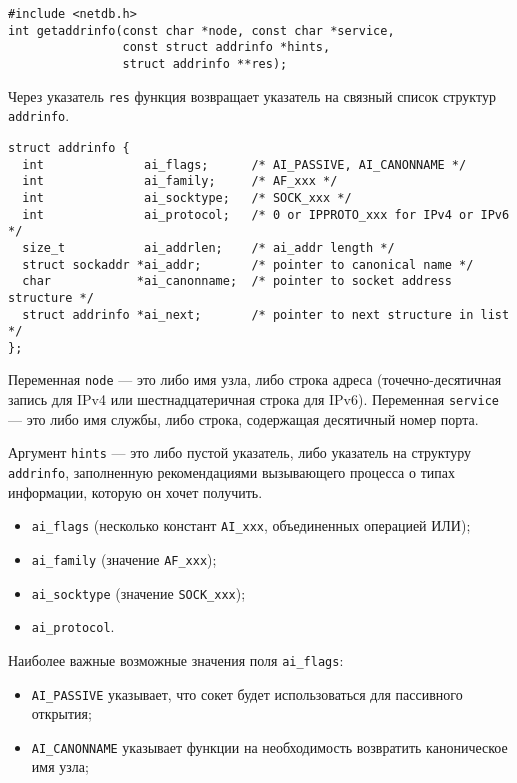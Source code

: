 \lstset{language=C,caption=}
\begin{lstlisting}
#include <netdb.h>
int getaddrinfo(const char *node, const char *service,
                const struct addrinfo *hints,
                struct addrinfo **res);
\end{lstlisting}

Через указатель \lstinline{res} функция возвращает указатель на связный список структур \lstinline{addrinfo}.
\lstset{language=C,caption=}
\begin{lstlisting}
struct addrinfo {
  int              ai_flags;      /* AI_PASSIVE, AI_CANONNAME */
  int              ai_family;     /* AF_xxx */
  int              ai_socktype;   /* SOCK_xxx */
  int              ai_protocol;   /* 0 or IPPROTO_xxx for IPv4 or IPv6 */
  size_t           ai_addrlen;    /* ai_addr length */
  struct sockaddr *ai_addr;       /* pointer to canonical name */
  char            *ai_canonname;  /* pointer to socket address structure */
  struct addrinfo *ai_next;       /* pointer to next structure in list */
};
\end{lstlisting}

Переменная \lstinline{node} --- это либо имя узла, либо строка адреса (точечно-десятичная запись для IPv4 или шестнадцатеричная строка для IPv6). Переменная \lstinline{service} --- это либо имя службы, либо строка, содержащая десятичный номер порта.

Аргумент \lstinline{hints} --- это либо пустой указатель, либо указатель на структуру \lstinline{addrinfo}, заполненную рекомендациями вызывающего процесса о типах информации, которую он хочет получить.
\begin{itemize}
  \item \lstinline{ai_flags} (несколько констант \lstinline{AI_xxx}, объединенных операцией ИЛИ);
  \item \lstinline{ai_family} (значение \lstinline{AF_xxx});
  \item \lstinline{ai_socktype} (значение \lstinline{SOCK_xxx});
  \item \lstinline{ai_protocol}.
\end{itemize}

Наиболее важные возможные значения поля \lstinline{ai_flags}:
\begin{itemize}
  \item \lstinline{AI_PASSIVE} указывает, что сокет будет использоваться для пассивного открытия;
  \item \lstinline{AI_CANONNAME} указывает функции на необходимость возвратить каноническое имя узла;
\end{itemize}

